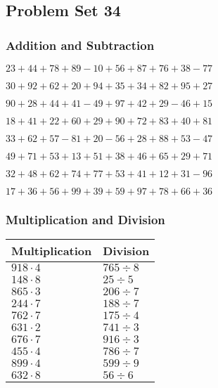 \hypertarget{problem-set-34}{%
\subsection{Problem Set 34}\label{problem-set-34}}

\hypertarget{addition-and-subtraction}{%
\subsubsection{Addition and
Subtraction}\label{addition-and-subtraction}}

\(23+44+78+89-10+56+87+76+38-77\)

\(30+92+62+20+94+35+34+82+95+27\)

\(90+28+44+41-49+97+42+29-46+15\)

\(18+41+22+60+29+90+72+83+40+81\)

\(33+62+57-81+20-56+28+88+53-47\)

\(49+71+53+13+51+38+46+65+29+71\)

\(32+48+62+74+77+53+41+12+31-96\)

\(17+36+56+99+39+59+97+78+66+36\)

\hypertarget{multiplication-and-division}{%
\subsubsection{Multiplication and
Division}\label{multiplication-and-division}}

\begin{longtable}[]{@{}ll@{}}
\toprule
Multiplication & Division\tabularnewline
\midrule
\endhead
\(918\cdot4\) & \(765÷8\)\tabularnewline
\(148\cdot8\) & \(25÷5\)\tabularnewline
\(865\cdot3\) & \(206÷7\)\tabularnewline
\(244\cdot7\) & \(188÷7\)\tabularnewline
\(762\cdot7\) & \(175÷4\)\tabularnewline
\(631\cdot2\) & \(741÷3\)\tabularnewline
\(676\cdot7\) & \(916÷3\)\tabularnewline
\(455\cdot4\) & \(786÷7\)\tabularnewline
\(899\cdot4\) & \(599÷9\)\tabularnewline
\(632\cdot8\) & \(56÷6\)\tabularnewline
\bottomrule
\end{longtable}
